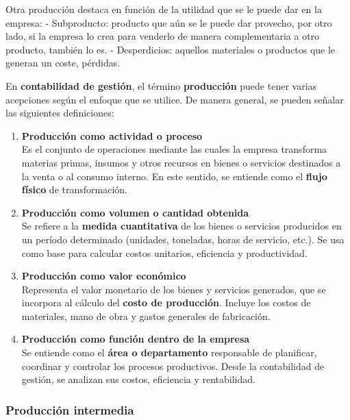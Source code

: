 \documentclass[12pt]{report} %
\begin{document}
Otra producción destaca en función de la utilidad que se le puede dar en
la empresa: - Subproducto: producto que aún se le puede dar provecho,
por otro lado, si la empresa lo crea para venderlo de manera
complementaria a otro producto, también lo es. - Desperdicios: aquellos
materiales o productos que le generan un coste, pérdidas.

En \textbf{contabilidad de gestión}, el término \textbf{producción}
puede tener varias acepciones según el enfoque que se utilice. De manera
general, se pueden señalar las siguientes definiciones:

\begin{enumerate}
\def\labelenumi{\arabic{enumi}.}
\item
  \textbf{Producción como actividad o proceso}\\
  Es el conjunto de operaciones mediante las cuales la empresa
  transforma materias primas, insumos y otros recursos en bienes o
  servicios destinados a la venta o al consumo interno. En este sentido,
  se entiende como el \textbf{flujo físico} de transformación.
\item
  \textbf{Producción como volumen o cantidad obtenida}\\
  Se refiere a la \textbf{medida cuantitativa} de los bienes o servicios
  producidos en un período determinado (unidades, toneladas, horas de
  servicio, etc.). Se usa como base para calcular costos unitarios,
  eficiencia y productividad.
\item
  \textbf{Producción como valor económico}\\
  Representa el valor monetario de los bienes y servicios generados, que
  se incorpora al cálculo del \textbf{costo de producción}. Incluye los
  costos de materiales, mano de obra y gastos generales de fabricación.
\item
  \textbf{Producción como función dentro de la empresa}\\
  Se entiende como el \textbf{área o departamento} responsable de
  planificar, coordinar y controlar los procesos productivos. Desde la
  contabilidad de gestión, se analizan sus costos, eficiencia y
  rentabilidad.
\end{enumerate}

\subsubsection*{Producción intermedia}

\end{document}
